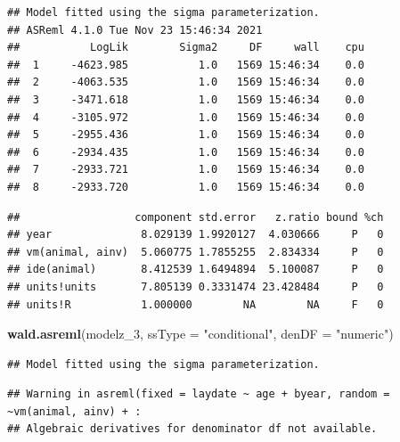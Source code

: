 \documentclass[
  12pt,
]{book}
\newenvironment{Shaded}{\begin{snugshade}}{\end{snugshade}}
\newcommand{\DataTypeTok}[1]{\textcolor[rgb]{0.13,0.29,0.53}{#1}}
\newcommand{\DecValTok}[1]{\textcolor[rgb]{0.00,0.00,0.81}{#1}}
\newcommand{\KeywordTok}[1]{\textcolor[rgb]{0.13,0.29,0.53}{\textbf{#1}}}
\newcommand{\NormalTok}[1]{#1}
\newcommand{\OperatorTok}[1]{\textcolor[rgb]{0.81,0.36,0.00}{\textbf{#1}}}
\newcommand{\StringTok}[1]{\textcolor[rgb]{0.31,0.60,0.02}{#1}}
\begin{document}
\begin{verbatim}
## Model fitted using the sigma parameterization.
## ASReml 4.1.0 Tue Nov 23 15:46:34 2021
##           LogLik        Sigma2     DF     wall    cpu
##  1     -4623.985           1.0   1569 15:46:34    0.0
##  2     -4063.535           1.0   1569 15:46:34    0.0
##  3     -3471.618           1.0   1569 15:46:34    0.0
##  4     -3105.972           1.0   1569 15:46:34    0.0
##  5     -2955.436           1.0   1569 15:46:34    0.0
##  6     -2934.435           1.0   1569 15:46:34    0.0
##  7     -2933.721           1.0   1569 15:46:34    0.0
##  8     -2933.720           1.0   1569 15:46:34    0.0
\end{verbatim}

\begin{Shaded}
\end{Shaded}

\begin{verbatim}
##                  component std.error   z.ratio bound %ch
## year              8.029139 1.9920127  4.030666     P   0
## vm(animal, ainv)  5.060775 1.7855255  2.834334     P   0
## ide(animal)       8.412539 1.6494894  5.100087     P   0
## units!units       7.805139 0.3331474 23.428484     P   0
## units!R           1.000000        NA        NA     F   0
\end{verbatim}

\begin{Shaded}
\begin{Highlighting}[]
\KeywordTok{wald.asreml}\NormalTok{(modelz\_}\DecValTok{3}\NormalTok{, }\DataTypeTok{ssType =} \StringTok{"conditional"}\NormalTok{, }\DataTypeTok{denDF =} \StringTok{"numeric"}\NormalTok{)}
\end{Highlighting}
\end{Shaded}

\begin{verbatim}
## Model fitted using the sigma parameterization.
\end{verbatim}

\begin{verbatim}
## Warning in asreml(fixed = laydate ~ age + byear, random = ~vm(animal, ainv) + :
## Algebraic derivatives for denominator df not available.
\end{verbatim}
\end{document}
